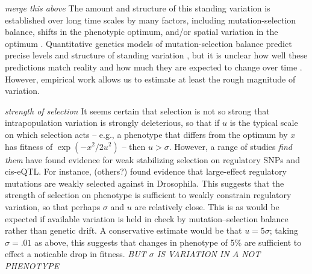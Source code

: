 \documentclass{article}
\newcommand{\plr}[1]{{\color{blue}\it #1}}
\newcommand{\1}{\mathbbm{1}}
\begin{document}
  \plr{merge this above}
  The amount and structure of this standing variation is established over long time scales
  by many factors, including
  mutation-selection balance, 
  shifts in the phenotypic optimum,
  and/or spatial variation in the optimum \citep{hansen1996translating}.
  Quantitative genetics models of mutation-selection balance 
  predict precise levels and structure of standing variation \citep{kimura_mutsel,lande_mutsel,lande1981models},
  but it is unclear how well these predictions match reality \citep{johnson_barton}
  and how much they are expected to change over time \citep{arnold_changing_G}.
  However, empirical work allows us to estimate at least the rough magnitude of variation.

  \plr{strength of selection}
  It seems certain that selection is not so strong that intrapopulation variation
  is strongly deleterious,
  so that if $u$ is the typical scale on which selection acts
  -- e.g., a phenotype that differs from the optimum by $x$ has fitness of $\exp(-x^2/2u^2)$ --
  then $u > \sigma$.
  However,
  a range of studies \plr{find them} have found evidence for weak stabilizing selection
  on regulatory SNPs and cis-eQTL.
  For instance, 
  \citet{maria_and_sergey} (others?) found evidence that large-effect regulatory mutations are weakly selected against in Drosophila.
  This suggests that 
  the strength of selection on phenotype is sufficient to weakly constrain regulatory variation,
  so that perhaps $\sigma$ and $u$ are relatively close.
  This is as would be expected if available variation is held in check by mutation--selection balance
  rather than genetic drift.
  A conservative estimate would be that $u = 5 \sigma$;
  taking $\sigma=.01$ as above, this suggests that changes in phenotype of 5\% are sufficient
  to effect a noticable drop in fitness.
  \plr{BUT $\sigma$ IS VARIATION IN $A$ NOT PHENOTYPE}
\end{document}
